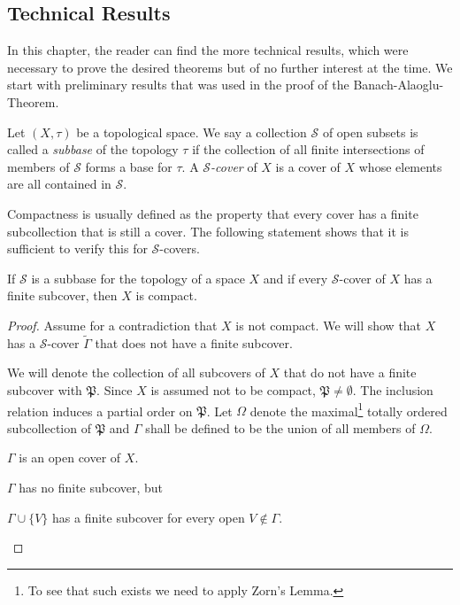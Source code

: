 \begin{appendices}
\newcommand{\scrS}{\mathscr{S}}
\chapter{Technical Results}
	
	In this chapter, the reader can find the more technical results, which were necessary to prove the desired theorems but of no further interest at the time. We start with preliminary results that was used in the proof of the  Banach-Alaoglu-Theorem.
	
	\begin{definition}
		Let $(X,\tau)$ be a topological space. We say a collection $\scrS$ of open subsets is called a \emph{subbase} of the topology $\tau$ if the collection of all finite intersections of members of $\scrS$ forms a base for $\tau$. A \emph{$\scrS$-cover} of $X$ is a cover of $X$ whose elements are all contained in $\scrS$.
	\end{definition}

Compactness is usually defined as the property that every cover has a finite subcollection that is still a cover. The following statement \cite[see][]{rudin:functional-analysis} shows that it is sufficient to verify this for $\scrS$-covers.

	\begin{theorem}\label{thm:subbase}
		If $\scrS$ is a subbase for the topology of a space $X$ and if every $\scrS$-cover of $X$ has a finite subcover, then $X$ is compact.
	\end{theorem}
\begin{proof}
	Assume for a contradiction that $X$ is not compact. We will show that $X$ has a $\scrS$-cover $\tilde{\Gamma}$ that does not have a finite subcover.
	
	We will denote the collection of all subcovers  of $X$ that do not have a finite subcover with $\mathfrak{P}$. Since $X$ is assumed not to be compact, $\mathfrak{P}\neq \emptyset$. The inclusion relation induces a partial order on $\mathfrak{P}$. Let $\Omega$ denote the maximal\footnote{To see that such exists we need to apply Zorn's Lemma.
	} totally ordered subcollection of $\mathfrak{P}$ and $\Gamma$ shall be defined to be the union of all members of $\Omega$.
	\begin{myassertion}\label{ass:open-cover}
		$\Gamma$ is an open cover of $X$.
	\end{myassertion}
	\begin{myassertion}\label{ass:no-finite-cover}
		$\Gamma$ has no finite subcover, but
	\end{myassertion}
	\begin{myassertion}\label{ass:finite-subcover}
		$\Gamma\cup\{V\}$ has a finite subcover for every open $V\not\in \Gamma$.
	\end{myassertion}
	

\end{proof}
\end{appendices}
